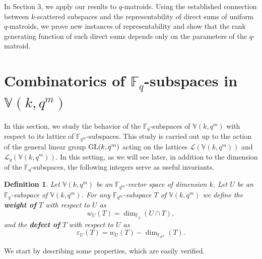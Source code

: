\documentclass[11pt]{amsart}
\newtheorem{definition}[theorem]{Definition}
\newcommand{\fqm}{\mathbb{F}_{q^m}}
\newcommand{\F}{{\mathbb F}}
\newcommand{\GL}{\hbox{{\rm GL}}}
\newcommand{\fq}{{\mathbb F}_{q}}
\begin{document}
In Section 3, we apply our results to $q$-matroids. Using the established connection between $k$-scattered subspaces and the representability of direct sums of uniform $q$-matroids, we prove new instances of representability and show that the rank generating function of such direct sums depends only on the parameters of the $q$-matroid.


\section{Combinatorics of $\fq$-subspaces in $\mathbb{V}(k,q^m)$}


In this section, we study the behavior of the $\fq$-subspaces of $\mathbb{V}(k,q^m)$   with respect to its lattice of $\fqm$-subspaces.
This study is carried out up to the action of the general linear group $\GL(k,q^m)$ acting on the lattices ${\mathcal L}(\mathbb{V}(k,q^m))$ and ${\mathcal L}_q(\mathbb{V}(k,q^m))$.
In this setting, as we will see later, in addition to the dimension of the $\fq$-subspaces, the following integers serve as useful invariants.  

\begin{definition}
    Let $\mathbb{V}(k,q^m)$ be an $\F_{q^m}$-vector space of dimension $k$. Let $U$ be an $\fq$-subspace of $\mathbb{V}(k,q^m)$. For any $\fqm$-subspace $T$ of $\mathbb{V}(k,q^m)$ we define the \textbf{weight of} $T$ with respect to $U$ as
    \[ w_U(T)=\dim_{\fq}(U\cap T), \]
    and the \textbf{defect of} $T$ with respect to $U$ as
    \[ \varepsilon_U(T)=w_U(T)-\dim_{\fqm}(T). \]
\end{definition}

We start by describing some properties, which are easily verified.
\end{document}

